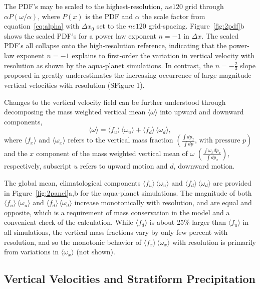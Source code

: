 \documentclass[alpha-refs]{wiley-article}
\begin{document}
The PDF's may be scaled to the highest-resolution, $ne120$ grid through $ \alpha P (\omega / \alpha)$, where $P(x)$ is the PDF and $\alpha$ the scale factor from equation~\ref{eq:alpha} with $\Delta x_0$ set to the $ne120$ grid-spacing. Figure~\ref{fig:2pdf}b shows the scaled PDF's for a power law exponent $n=-1$ in $\Delta x$. The scaled PDF's all collapse onto the high-resolution reference, indicating that the power-law exponent $n=-1$ explains to first-order the variation in vertical velocity with resolution as shown by the aqua-planet simulations. In contrast, the $n=-\frac{2}{3}$ slope proposed in \cite{RETAL2016CD} greatly underestimates the increasing occurrence of large magnitude vertical velocities with resolution (SFigure 1).

Changes to the vertical velocity field can be further understood through decomposing the mass weighted vertical mean $ \langle \omega \rangle$ into upward and downward components,
\begin{equation}
\langle \omega \rangle =\langle f_{u} \rangle \, \langle \omega_{u} \rangle + \langle f_{d} \rangle \, \langle \omega_{d} \rangle, \label{eq:omega}
\end{equation}
where $\langle f_x \rangle$ and $\langle \omega_x \rangle$ refers to the vertical mass fraction $ \left( \frac{\int dp_x}{\int dp} \textrm{, with pressure } p \right)$ and the $x$ component of the mass weighted vertical mean of $\omega$ $ \left( \frac{\int \omega_x dp_x}{\int dp_x} \right)$, respectively, subscript $u$ refers to upward motion and $d$, downward motion.

The global mean, climatological components $\langle f_{u} \rangle \, \langle \omega_{u} \rangle$ and $\langle f_{d} \rangle \, \langle \omega_{d} \rangle$ are provided in Figure~\ref{fig:2panel}a,b for the aqua-planet simulations. The magnitude of both $\langle f_{u} \rangle \, \langle \omega_{u} \rangle$ and $\langle f_{d} \rangle \, \langle \omega_{d} \rangle$ increase monotonically with resolution, and are equal and opposite, which is a requirement of mass conservation in the model and a convenient check of the calculation. While $\langle f_{d} \rangle$ is about 25\% larger than $\langle f_{u} \rangle$ in all simulations, the vertical mass fractions vary by only few percent with resolution, and so the monotonic behavior of $\langle f_{x} \rangle \, \langle \omega_{x} \rangle$ with resolution is primarily from variations in $ \langle \omega_{x} \rangle$ (not shown).

\subsection{Vertical Velocities and Stratiform Precipitation}
\end{document}
